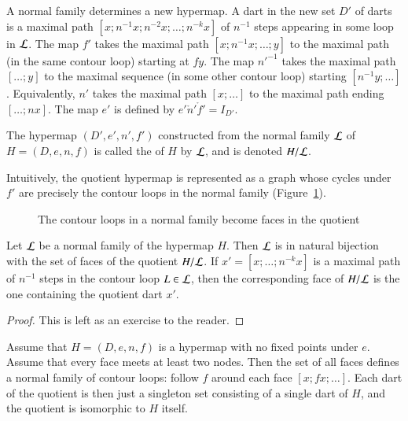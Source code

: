 A normal family determines a new hypermap.  A dart in the new set $D'$
of darts is a maximal path $[x;n^{-1} x; n^{-2} x;\ldots;n^{-k}
x]$ of $n^{-1}$ steps appearing in some loop in $\cal L$. The map $f'$
takes the maximal path $[x;n^{-1}x;\ldots;y]$ to the maximal path (in
the same contour loop) starting at $f y$. The map ${n'}^{-1}$ takes
the maximal path $[\ldots;y]$ to the maximal sequence (in some other
contour loop) starting $[n^{-1}y;\ldots]$. Equivalently, $n'$ takes
the maximal path $[x;\ldots]$ to the maximal path ending $[\ldots;n
x]$. The map $e'$ is defined by $e'\ocirc n'\ocirc f' = I_{D'}$.
%

\begin{definition}[quotient] The hypermap $(D',e',n',f')$
constructed from the normal
family $\cal L$ of $H=(D,e,n,f)$ 
is called the  of $H$ by $\cal L$, and is denoted
$H/{\cal L}$.  
%
\end{definition}
%
%
%
%

Intuitively, the quotient hypermap is represented as a graph whose
cycles under $f'$ are precisely the contour loops in the normal family
(Figure~\ref{fig:quot}).


\begin{figure}[htb]
\centering
{}
\caption{The contour loops in a normal family become faces in the
quotient}
\label{fig:quot}
\end{figure}

\begin{lemma}\label{lemma:quotient-bijection}
Let ${\cal L}$ be a normal family of the hypermap $H$.  Then ${\cal L}$ is in
natural bijection with the set of faces
of the quotient $H/{\cal L}$.  If $x'=[x;\ldots;n^{-k}x]$ is a maximal path of $n^{-1}$ steps in
the contour loop
$L\in{\cal L}$, then the corresponding face of $H/{\cal L}$ is the one containing the
quotient dart $x'$.
\end{lemma}

\begin{proof}  This is left as an exercise to the reader.
\end{proof}


\begin{example}\label{ex:Hall} 
Assume that $H=(D,e,n,f)$ is a hypermap with no fixed points under $e$. Assume
that every face meets at least two nodes. Then the set of all faces
defines a normal family of contour loops: follow $f$ around each
face $[x;f x;\ldots]$.  Each dart of the quotient is then just a
singleton set consisting of a single dart of $H$, and the quotient
is isomorphic to $H$ itself.
\end{example}

